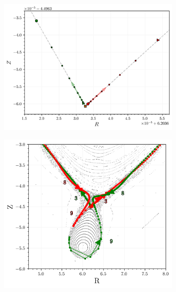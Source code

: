 \begin{figure}[H]
    \centering
    \begin{minipage}{0.45\textwidth} %
        \centering
        \begin{subfigure}[b]{\textwidth}
            \centering
            \includegraphics[width=\textwidth]{images/manifold/manifold_start.png}
            \caption{}
            \label{fig:}
        \end{subfigure}
        \vfill
        \vspace{10px}
        \vfill
        \begin{subfigure}[b]{0.99\textwidth}
            \centering
            \includegraphics[width=\textwidth]{images/manifold/manifold_closer.png}

\end{subfigure}
\end{minipage}
\end{figure}
